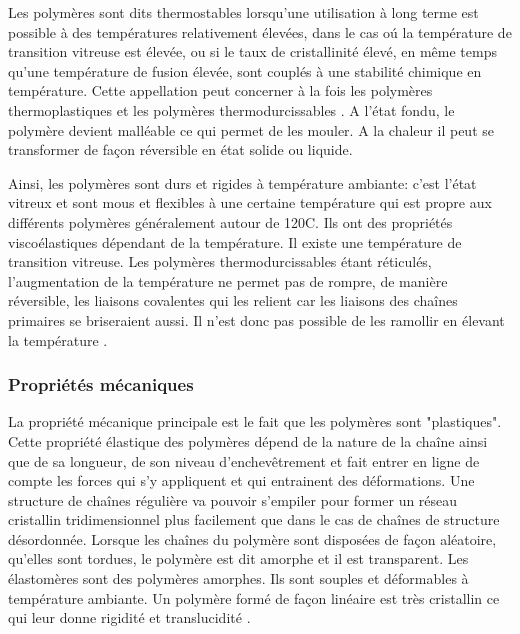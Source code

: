 \par{
Les polym\`eres sont dits thermostables lorsqu'une utilisation \`a long terme est possible \`a des temp\'eratures relativement \'elev\'ees, dans le cas o\'u la temp\'erature de transition vitreuse est \'elev\'ee, ou si le taux de cristallinit\'e \'elev\'e, en m\^eme temps qu'une temp\'erature de fusion \'elev\'ee, sont coupl\'es \`a une stabilit\'e chimique en temp\'erature. Cette appellation peut concerner \`a la fois les polym\`eres thermoplastiques et les polym\`eres thermodurcissables {\citep{domin2013}}. A l'\'etat fondu, le polym\`ere devient mall\'eable ce qui permet de les mouler. A la chaleur il peut se transformer de fa\c con r\'eversible en \'etat solide ou liquide.
}
\par{
Ainsi, les polym\`eres sont durs et rigides \`a temp\'erature ambiante: c'est l'\'etat vitreux et sont mous et flexibles \`a une certaine temp\'erature qui est propre aux diff\'erents polym\`eres g\'en\'eralement autour de 120\degree C. Ils ont des propri\'et\'es visco\'elastiques d\'ependant de la temp\'erature. Il existe une temp\'erature de transition vitreuse. Les polym\`eres thermodurcissables \'etant r\'eticul\'es, l'augmentation de la temp\'erature ne permet pas de rompre, de mani\`ere r\'eversible, les liaisons covalentes qui les relient car les liaisons des cha\^ines primaires se briseraient aussi. Il n'est donc pas possible de les ramollir en \'elevant la temp\'erature {\citep{lecomte2009physique}}.
}

\subsubsection{Propri\'et\'es m\'ecaniques}
\par{
La propri\'et\'e m\'ecanique principale est le fait que les polym\`eres sont "plastiques". Cette propri\'et\'e \'elastique des polym\`eres d\'epend de la nature de la cha\^ine ainsi que de sa longueur, de son niveau d'enchev\^etrement et fait entrer en ligne de compte les forces qui s'y appliquent et qui entrainent des d\'eformations. Une structure de cha\^ines r\'eguli\`ere va pouvoir s'empiler pour former un r\'eseau cristallin tridimensionnel plus facilement que dans le cas de cha\^ines de structure d\'esordonn\'ee. Lorsque les cha\^ines du polym\`ere sont dispos\'ees de fa\c con al\'eatoire, qu'elles sont tordues, le polym\`ere est dit amorphe et il est transparent. Les \'elastom\`eres sont des polym\`eres amorphes. Ils sont souples et d\'eformables  \`a temp\'erature ambiante. Un polym\`ere form\'e de fa\c con lin\'eaire est tr\`es cristallin ce qui leur donne rigidit\'e et translucidit\'e {\citep{lecomte2009physique}}.
}

